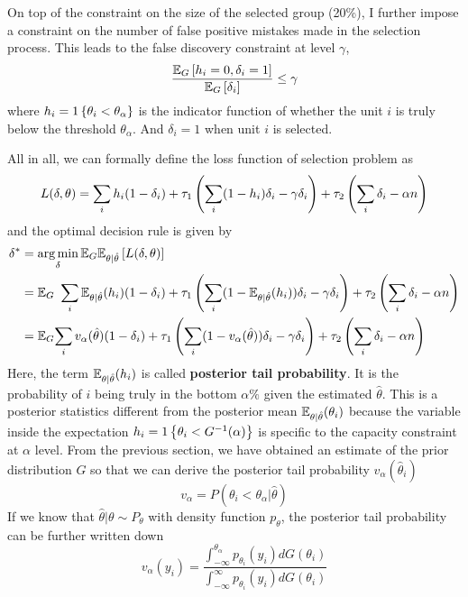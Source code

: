 \documentclass[12pt]{article}
\begin{document}
On top of the constraint on the size of the selected group (20\%), I further
impose a constraint on the number of false positive mistakes made in the
selection process. This leads to the false discovery constraint at level
$\gamma$,
\begin{equation*}
    \frac{\mathbb{E}_G\left[h_i=0,\delta_i=1\right]}{\mathbb{E}_G\left[\delta_i\right]} \le \gamma
\end{equation*} where $h_i=1\left\{\theta_i<\theta_\alpha\right\}$ is the indicator function of whether the unit $i$ is truly below the threshold $\theta_\alpha$. And $\delta_i=1$ when unit $i$ is selected.

All in all, we can formally define the loss function of selection problem as
\begin{equation*}
    L(\delta,\theta)=\sum_i h_i(1-\delta_i) +\tau_1\left(\sum_i (1-h_i)\delta_i -\gamma \delta_i\right) + \tau_2 \left(\sum_i \delta_i -\alpha n\right)
\end{equation*}
and the optimal decision rule is given by
\begin{equation*}
    \begin{split}
        \delta^* & =\operatorname*{arg\,min}_\delta \mathbb{E}_G\mathbb{E}_{\theta|\hat{\theta}}\left[L(\delta,\theta)\right]                                                                                                              \\
                 & = \mathbb{E}_G \ \sum_i \mathbb{E}_{\theta|\hat{\theta}}(h_i)(1-\delta_i) +\tau_1\left(\sum_i (1-\mathbb{E}_{\theta|\hat{\theta}}(h_i))\delta_i -\gamma \delta_i\right) + \tau_2 \left(\sum_i \delta_i -\alpha n\right) \\
                 & =\mathbb{E}_G{\sum_i v_\alpha(\hat{\theta})(1-\delta_i) +\tau_1\left(\sum_i (1-v_\alpha(\hat{\theta}))\delta_i -\gamma \delta_i\right) + \tau_2 \left(\sum_i \delta_i -\alpha n\right)}
    \end{split}
\end{equation*}
Here, the term $\mathbb{E}_{\theta|\hat{\theta}}(h_i)$ is called \textbf{posterior tail probability}. It is the probability of $i$ being truly in the bottom $\alpha\%$ given the estimated $\hat{\theta}$.
This is a posterior statistics different from the posterior mean $\mathbb{E}_{\theta|\hat{\theta}}(\theta_i)$ because the variable inside the expectation $h_i=1\left\{\theta_i<G^{-1}(\alpha)\right\}$ is specific to the capacity constraint at $\alpha$ level.
From the previous section, we have obtained an estimate of the prior distribution $G$ so that we can derive the posterior tail probability $v_\alpha(\hat{\theta}_i)$
\begin{equation*}
    v_\alpha=P( \theta_i < \theta_{\alpha} |\hat{\theta})
\end{equation*}
If we know that $\hat{\theta}|\theta \sim P_\theta$ with density function $p_\theta$, the posterior tail probability can be further written down
\begin{equation*}
    v_\alpha(y_i)=\frac{{\int_{-\infty}^{\theta_{\alpha}} p_{\theta_i}(y_i) dG(\theta_i)}}
    {{\int_{-\infty}^{\infty} p_{\theta_i}(y_i) dG(\theta_i)}}
\end{equation*}
\end{document}
